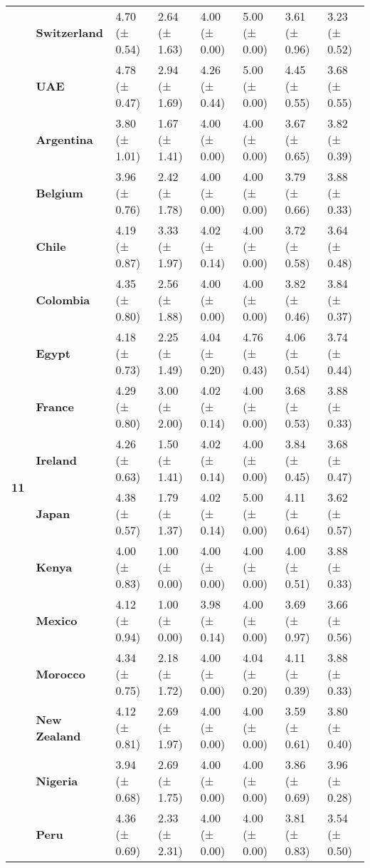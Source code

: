\begin{longtable}{llllllll}
\textbf{} & \textbf{Switzerland} & 4.70 (± 0.54) & 2.64 (± 1.63) & 4.00 (± 0.00) & 5.00 (± 0.00) & 3.61 (± 0.96) & 3.23 (± 0.52) \\
\textbf{} & \textbf{UAE} & 4.78 (± 0.47) & 2.94 (± 1.69) & 4.26 (± 0.44) & 5.00 (± 0.00) & 4.45 (± 0.55) & 3.68 (± 0.55) \\
\cline{1-8}
\multirow[t]{19}{*}{\textbf{11}} & \textbf{Argentina} & 3.80 (± 1.01) & 1.67 (± 1.41) & 4.00 (± 0.00) & 4.00 (± 0.00) & 3.67 (± 0.65) & 3.82 (± 0.39) \\
\textbf{} & \textbf{Belgium} & 3.96 (± 0.76) & 2.42 (± 1.78) & 4.00 (± 0.00) & 4.00 (± 0.00) & 3.79 (± 0.66) & 3.88 (± 0.33) \\
\textbf{} & \textbf{Chile} & 4.19 (± 0.87) & 3.33 (± 1.97) & 4.02 (± 0.14) & 4.00 (± 0.00) & 3.72 (± 0.58) & 3.64 (± 0.48) \\
\textbf{} & \textbf{Colombia} & 4.35 (± 0.80) & 2.56 (± 1.88) & 4.00 (± 0.00) & 4.00 (± 0.00) & 3.82 (± 0.46) & 3.84 (± 0.37) \\
\textbf{} & \textbf{Egypt} & 4.18 (± 0.73) & 2.25 (± 1.49) & 4.04 (± 0.20) & 4.76 (± 0.43) & 4.06 (± 0.54) & 3.74 (± 0.44) \\
\textbf{} & \textbf{France} & 4.29 (± 0.80) & 3.00 (± 2.00) & 4.02 (± 0.14) & 4.00 (± 0.00) & 3.68 (± 0.53) & 3.88 (± 0.33) \\
\textbf{} & \textbf{Ireland} & 4.26 (± 0.63) & 1.50 (± 1.41) & 4.02 (± 0.14) & 4.00 (± 0.00) & 3.84 (± 0.45) & 3.68 (± 0.47) \\
\textbf{} & \textbf{Japan} & 4.38 (± 0.57) & 1.79 (± 1.37) & 4.02 (± 0.14) & 5.00 (± 0.00) & 4.11 (± 0.64) & 3.62 (± 0.57) \\
\textbf{} & \textbf{Kenya} & 4.00 (± 0.83) & 1.00 (± 0.00) & 4.00 (± 0.00) & 4.00 (± 0.00) & 4.00 (± 0.51) & 3.88 (± 0.33) \\
\textbf{} & \textbf{Mexico} & 4.12 (± 0.94) & 1.00 (± 0.00) & 3.98 (± 0.14) & 4.00 (± 0.00) & 3.69 (± 0.97) & 3.66 (± 0.56) \\
\textbf{} & \textbf{Morocco} & 4.34 (± 0.75) & 2.18 (± 1.72) & 4.00 (± 0.00) & 4.04 (± 0.20) & 4.11 (± 0.39) & 3.88 (± 0.33) \\
\textbf{} & \textbf{New Zealand} & 4.12 (± 0.81) & 2.69 (± 1.97) & 4.00 (± 0.00) & 4.00 (± 0.00) & 3.59 (± 0.61) & 3.80 (± 0.40) \\
\textbf{} & \textbf{Nigeria} & 3.94 (± 0.68) & 2.69 (± 1.75) & 4.00 (± 0.00) & 4.00 (± 0.00) & 3.86 (± 0.69) & 3.96 (± 0.28) \\
\textbf{} & \textbf{Peru} & 4.36 (± 0.69) & 2.33 (± 2.31) & 4.00 (± 0.00) & 4.00 (± 0.00) & 3.81 (± 0.83) & 3.54 (± 0.50) \\

\end{longtable}
